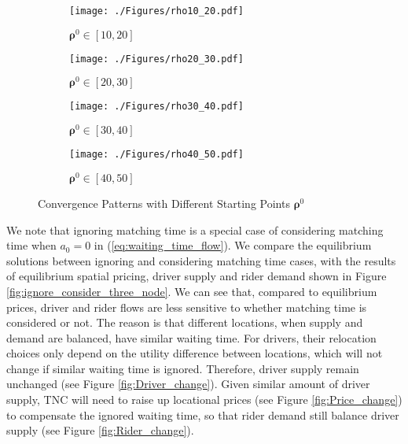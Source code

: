 \documentclass[review]{elsarticle}
\begin{document}
\begin{figure*}[htbp]
	\centering
		\begin{subfigure}[t]{.49\linewidth}
			\centering
			\caption{$\bm{\rho}^{0} \in [10, 20]$}
			\texttt{[image: ./Figures/rho10\_20.pdf]}
			\label{fig:rho_1020}
		\end{subfigure}
		\begin{subfigure}[t]{.49\linewidth}
			\centering
			\caption{$\bm{\rho}^{0} \in [20, 30]$}
			\texttt{[image: ./Figures/rho20\_30.pdf]} 
			\label{fig:rho_2030}
	    \end{subfigure}
	    \begin{subfigure}[t]{.49\linewidth}
			\centering
			\caption{$\bm{\rho}^{0} \in [30, 40]$}
			\texttt{[image: ./Figures/rho30\_40.pdf]}
			\label{fig:rho_3040}
		\end{subfigure}
		\begin{subfigure}[t]{.49\linewidth}
			\centering
			\caption{$\bm{\rho}^{0} \in [40, 50]$}
			\texttt{[image: ./Figures/rho40\_50.pdf]} 
			\label{fig:rho_4050}
	\end{subfigure}
	\vspace{-2em}
	\caption{Convergence Patterns with Different Starting Points $\bm{\rho}^{0}$}
	\label{fig:three_node_conv}
\end{figure*}

We note that ignoring matching time is a special case of considering matching time when $a_0 = 0$ in (\ref{eq:waiting_time_flow}). We compare the equilibrium solutions between ignoring and considering matching time cases, with the results of equilibrium spatial pricing, driver supply and rider demand shown in Figure \ref{fig:ignore_consider_three_node}. We can see that, compared to equilibrium prices, driver and rider flows are less sensitive to whether matching time is considered or not. The reason is that different locations, when supply and demand are balanced, have similar waiting time. For drivers, their relocation choices only depend on the utility difference between locations, which will not change if similar waiting time is ignored. Therefore, driver supply remain unchanged (see Figure \ref{fig:Driver_change}). Given similar amount of driver supply, TNC will need to raise up locational prices (see Figure \ref{fig:Price_change}) to compensate the ignored waiting time, so that rider demand still balance driver supply (see Figure \ref{fig:Rider_change}).
\end{document}
